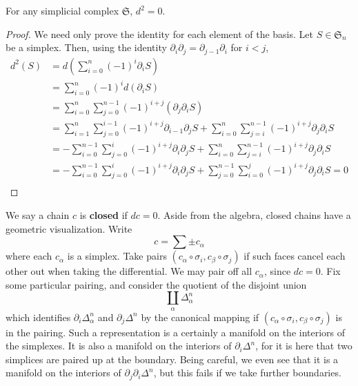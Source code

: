 \begin{lemma}
    For any simplicial complex $\mathfrak{S}$, $d^2 = 0$.
\end{lemma}
\begin{proof}
    We need only prove the identity for each element of the basis. Let $S \in \mathfrak{S}_n$ be a simplex. Then, using the identity $\partial_i \partial_j = \partial_{j-1} \partial_i$ for $i < j$,
    \begin{align*}
        d^2(S) &= d \left( \sum_{i = 0}^n (-1)^i \partial_i S \right)\\
        &= \sum_{i = 0}^n (-1)^i d(\partial_i S)\\
        &= \sum_{i = 0}^n \sum_{j = 0}^{n-1} (-1)^{i+j} (\partial_j \partial_i S)\\
        &= \sum_{i = 1}^n \sum_{j = 0}^{i-1} (-1)^{i+j} \partial_{i-1} \partial_j S + \sum_{i = 0}^n \sum_{j = i}^{n-1} (-1)^{i + j} \partial_j \partial_i S\\
        &= - \sum_{i = 0}^{n-1} \sum_{j = 0}^i (-1)^{i+j} \partial_i \partial_j S + \sum_{i = 0}^n \sum_{j = i}^{n-1} (-1)^{i+j} \partial_j \partial_i S\\
        &= - \sum_{i = 0}^{n-1} \sum_{j = 0}^i (-1)^{i+j} \partial_i \partial_j S + \sum_{j = 0}^{n-1} \sum_{i = 0}^j (-1)^{i+j} \partial_j \partial_i S = 0\\
    \end{align*}
\end{proof}

We say a chain $c$ is {\bf closed} if $dc = 0$. Aside from the algebra, closed chains have a geometric visualization. Write
%
\[ c = \sum \pm c_\alpha \]
%
where each $c_\alpha$ is a simplex. Take pairs $(c_\alpha \circ \sigma_i, c_\beta \circ \sigma_j)$ if such faces cancel each other out when taking the differential. We may pair off all $c_\alpha$, since $dc = 0$. Fix some particular pairing, and consider the quotient of the disjoint union
%
\[ \coprod_\alpha \Delta^n_\alpha \]
%
which identifies $\partial_i \Delta^n_\alpha$ and $\partial_j \Delta^n$ by the canonical mapping if $(c_\alpha \circ \sigma_i, c_\beta \circ \sigma_j)$ is in the pairing. Such a representation is a certainly a manifold on the interiors of the simplexes. It is also a manifold on the interiors of $\partial_i \Delta^n$, for it is here that two simplices are paired up at the boundary. Being careful, we even see that it is a manifold on the interiors of $\partial_j \partial_i \Delta^n$, but this fails if we take further boundaries.


